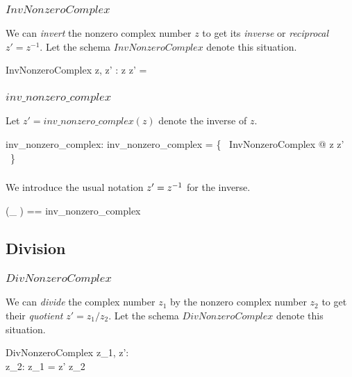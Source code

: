\documentclass[11pt, oneside]{article}
\begin{document}
\subsubsection{$InvNonzeroComplex$}

We can \textit{invert}
the nonzero complex number $z$ to get its \textit{inverse} or \textit{reciprocal} $z' = z^{-1}$.
Let the schema $InvNonzeroComplex$ denote this situation.

\begin{schema}{InvNonzeroComplex}
	z, z' : \Cnz
\where
	z \mulCnz z' = \oneC
\end{schema}

\subsubsection{$inv\_nonzero\_complex$}

Let $z' = inv\_nonzero\_complex(z)$ denote the inverse of $z$.

\begin{axdef}
	inv\_nonzero\_complex: \Cnz \fun \Cnz
\where
	inv\_nonzero\_complex = \{~ InvNonzeroComplex @ z \mapsto z' ~\}
\end{axdef}

\subsubsection{}

We introduce the usual notation $z' = z ^{-1}$ for the inverse.

\begin{zed}
	(\_ \invCnz) == inv\_nonzero\_complex
\end{zed}

\subsection{Division}

\subsubsection{$DivNonzeroComplex$}

We can \textit{divide} the complex number $z_1$ by the nonzero complex number $z_2$ 
to get their \textit{quotient} $z' = z_1 / z_2$.
Let the schema $DivNonzeroComplex$ denote this situation.

\begin{schema}{DivNonzeroComplex}
	z_1, z': \C \\
	z_2: \Cnz
\where
	z_1 = z' \mulCnz z_2
\end{schema}
\end{document}
